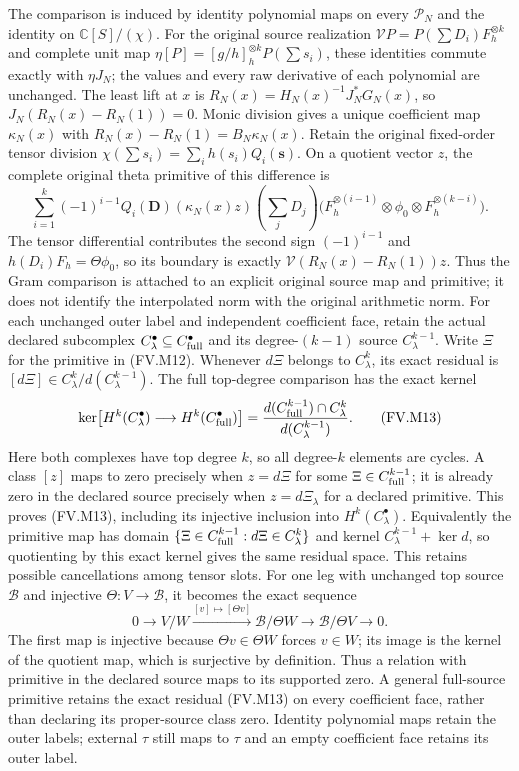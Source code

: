 The comparison is induced by identity polynomial maps on every
$\mathcal P_N$ and the identity on $\mathbb C[S]/(\chi)$.
For the original source realization
$\mathcal V P=P(\sum D_i)F_h^{\otimes k}$ and complete unit map
$\eta[P]=[g/h]_h^{\otimes k}P(\sum s_i)$, these identities commute
exactly with $\eta J_N$; the values and every raw derivative of each
polynomial are unchanged. The least lift at $x$ is
$R_N(x)=H_N(x)^{-1}J_N^*G_N(x)$, so
$J_N(R_N(x)-R_N(1))=0$. Monic division gives a unique coefficient
map $\kappa_N(x)$ with
$R_N(x)-R_N(1)=B_N\kappa_N(x)$.
Retain the original fixed-order tensor division
$\chi(\sum s_i)=\sum_i h(s_i)Q_i(\mathbf s)$. On a quotient vector
$z$, the complete original theta primitive of this difference is
\[
 \sum_{i=1}^k(-1)^{i-1}Q_i(\mathbf D)
       (\kappa_N(x)z)(\textstyle\sum_jD_j)
 \bigl(F_h^{\otimes(i-1)}\otimes\phi_0
                       \otimes F_h^{\otimes(k-i)}\bigr).
 \tag{FV.M12}\label{fvmetric:primitive}
\]
The tensor differential contributes the second sign $(-1)^{i-1}$
and $h(D_i)F_h=\Theta\phi_0$, so its boundary is exactly
$\mathcal V(R_N(x)-R_N(1))z$. Thus the Gram comparison is attached
to an explicit original source map and primitive; it does not identify
the interpolated norm with the original arithmetic norm. For each
unchanged outer label and independent coefficient face, retain the actual
declared subcomplex $C_\lambda^\bullet\subseteq C_{\rm full}^\bullet$
and its degree-$(k-1)$ source $C_\lambda^{k-1}$. Write $\Xi$ for
the primitive in (FV.M12). Whenever $d\Xi$ belongs to $C_\lambda^k$,
its exact residual is $[d\Xi]\in C_\lambda^k/d(C_\lambda^{k-1})$.
The full top-degree comparison has the exact kernel
\[
 \ker\bigl[H^k(C_\lambda^\bullet)\longrightarrow
                 H^k(C_{\rm full}^\bullet)\bigr]
 =\frac{d(C_{\rm full}^{k-1})\cap C_\lambda^k}
             {d(C_\lambda^{k-1})}.
 \tag{FV.M13}\label{fvmetric:proper-source}
\]
Here both complexes have top degree $k$, so all degree-$k$ elements
are cycles. A class $[z]$ maps to zero precisely when $z=d\Xi$ for
some $\Xi\in C_{\rm full}^{k-1}$; it is already zero in the declared
source precisely when $z=d\Xi_\lambda$ for a declared primitive.
This proves (FV.M13), including its injective inclusion into
$H^k(C_\lambda^\bullet)$. Equivalently the primitive map has domain
$\{\Xi\in C_{\rm full}^{k-1}:d\Xi\in C_\lambda^k\}$ and kernel
$C_\lambda^{k-1}+\ker d$, so quotienting by this exact kernel gives
the same residual space. This retains possible cancellations among
tensor slots. For one leg with unchanged top source $\mathscr B$
and injective $\Theta:V\to\mathscr B$, it becomes the exact sequence
\[
 0\longrightarrow V/W\xrightarrow{[v]\mapsto[\Theta v]}
 \mathscr B/\Theta W\longrightarrow\mathscr B/\Theta V
 \longrightarrow0.
 \tag{FV.M14}\label{fvmetric:one-leg-residual}
\]
The first map is injective because $\Theta v\in\Theta W$ forces
$v\in W$; its image is the kernel of the quotient map, which is
surjective by definition. Thus a relation with primitive in the
declared source maps to its supported zero. A general full-source
primitive retains the exact residual (FV.M13) on every coefficient
face, rather than declaring its proper-source class zero. Identity
polynomial maps retain the outer labels; external $\tau$ still maps
to $\tau$ and an empty coefficient face retains its outer label.

